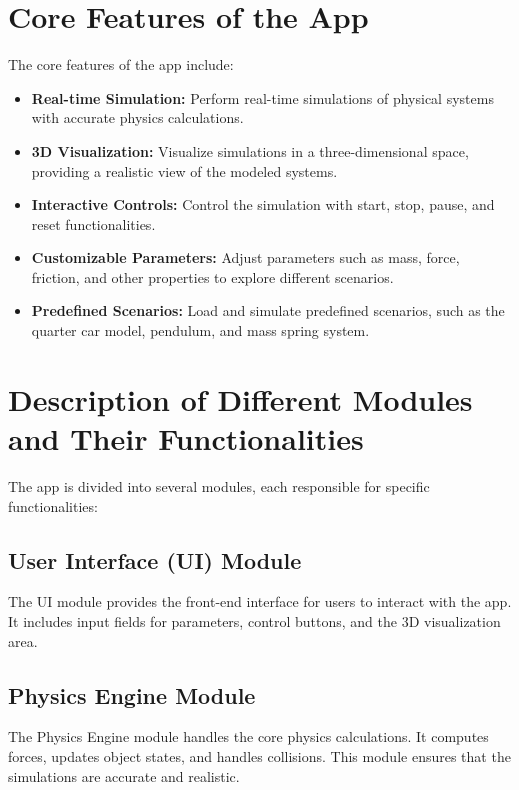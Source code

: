 \section{Core Features of the App}

The core features of the app include:
\begin{itemize}
    \item \textbf{Real-time Simulation:} Perform real-time simulations of physical systems with accurate physics calculations.
    \item \textbf{3D Visualization:} Visualize simulations in a three-dimensional space, providing a realistic view of the modeled systems.
    \item \textbf{Interactive Controls:} Control the simulation with start, stop, pause, and reset functionalities.
    \item \textbf{Customizable Parameters:} Adjust parameters such as mass, force, friction, and other properties to explore different scenarios.
    \item \textbf{Predefined Scenarios:} Load and simulate predefined scenarios, such as the quarter car model, pendulum, and mass spring system.
\end{itemize}

\section{Description of Different Modules and Their Functionalities}

The app is divided into several modules, each responsible for specific functionalities:

\subsection{User Interface (UI) Module}

The UI module provides the front-end interface for users to interact with the app. It includes input fields for parameters, control buttons, and the 3D visualization area.

\subsection{Physics Engine Module}

The Physics Engine module handles the core physics calculations. It computes forces, updates object states, and handles collisions. This module ensures that the simulations are accurate and realistic.

